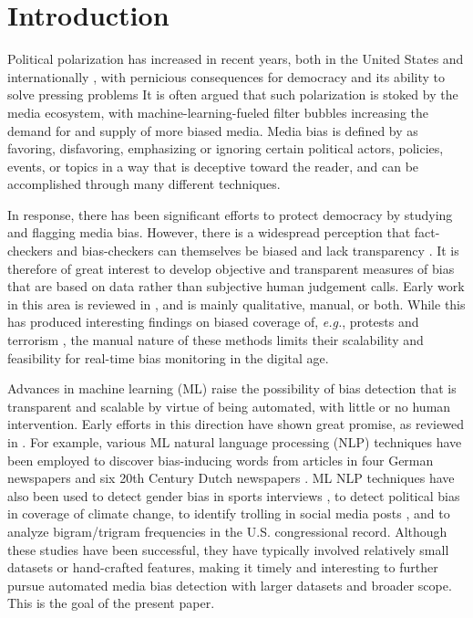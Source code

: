 \documentclass[10pt,letterpaper]{article}
\def\eg{{\frenchspacing\it e.g.}}
\begin{document}
\section*{Introduction}
\label{IntroSec}

Political polarization has increased in recent years, both in the United States and internationally \cite{wilson_polarization_2020}, 
with pernicious consequences for democracy and its ability to solve pressing problems \cite{mccoy2018polarization}
It is often argued that such polarization is stoked by the media ecosystem, with machine-learning-fueled filter bubbles \cite{pariser2011filter} increasing the demand for and supply of more biased media.
Media bias is defined by \cite{shultziner_distorting_2021}
as favoring, disfavoring, emphasizing or ignoring certain political actors, policies, events, or topics in a way that is deceptive toward the reader,
and can be accomplished through many different techniques.

In response, there has been significant efforts to protect democracy by studying and flagging media bias. However, there is a widespread perception that fact-checkers and bias-checkers can themselves be biased and lack transparency \cite{brandtzaeg2017trust}. It is therefore of great interest to develop objective and transparent measures of bias that
are based on data rather than subjective human judgement calls.
Early work in this area is reviewed in \cite{groseclose_socialscience_2005},
and is mainly qualitative, manual, or both. While this has produced interesting findings on biased coverage of, \eg, protests \cite{mccarthy_assessing_2008} and terrorism \cite{papacharissi_news_2008}, the manual nature of these methods limits their scalability and feasibility for real-time bias monitoring in the digital age.

Advances in machine learning (ML) raise the possibility of bias detection that is transparent and scalable by virtue of being automated, with little or no human intervention. Early efforts in this direction have shown great promise, as reviewed in \cite{hamborg_media_2020}. 
For example, various ML natural language processing (NLP) techniques have been employed to discover bias-inducing words from articles in four German newspapers \cite{spinde_media_2020} and six 20th Century Dutch newspapers \cite{wevers_using_2019}. ML NLP techniques have also been used to detect gender bias in sports interviews \cite{fu_tie-breaker_2016}, to detect political bias in coverage of climate change\cite{schuldt_global_2011}, to identify trolling in social media posts \cite{liu2019finding}, and to analyze bigram/trigram frequencies in the U.S. congressional record\cite{gentzkow_what_2010}.
Although these studies have been successful, they have typically involved relatively small datasets or hand-crafted features, making it timely and interesting to further pursue automated media bias detection with larger datasets and broader scope. This is the goal of the present paper.
\end{document}
